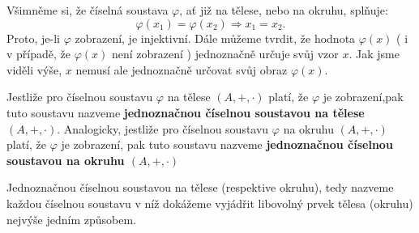 \documentclass[czech,bachelor,dept470,male]{diploma}
\begin{document}
\begin{remark}
	Všimněme si, že číselná soustava $\varphi$, ať již na tělese, nebo na okruhu, splňuje:
	$$\varphi (x_1) = \varphi(x_2) \Rightarrow x_1 = x_2.$$
	Proto, je-li $\varphi$ zobrazení, je injektivní.
	Dále můžeme tvrdit, že hodnota $\varphi(x)$ ( i v případě, že $\varphi(x)$ není zobrazení ) jednoznačně určuje svůj vzor $x$. Jak jsme viděli výše, $x$ nemusí ale jednoznačně určovat svůj obraz $\varphi(x)$.
\end{remark}
\begin{definition}
	Jestliže pro číselnou soustavu $\varphi$ na tělese $(A,+,\cdot)$ platí, že $\varphi$ je zobrazení,\newline pak tuto soustavu nazveme \textbf{jednoznačnou číselnou soustavou na tělese $(A,+,\cdot)$}. Analogicky, jestliže pro číselnou soustavu $\varphi$ na okruhu $(A,+,\cdot)$ platí, že $\varphi$ je zobrazení, pak tuto soustavu nazveme \textbf{jednoznačnou číselnou soustavou na okruhu $(A,+,\cdot)$}
\end{definition}
Jednoznačnou číselnou soustavou na tělese (respektive okruhu), tedy nazveme každou číselnou soustavu v níž dokážeme vyjádřit libovolný prvek tělesa (okruhu) nejvýše jedním způsobem.
\end{document}
